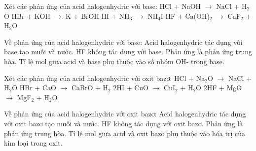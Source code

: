 \documentclass[Main.tex]{subfiles}
\begin{document}
    \begin{ex}
    Xét các phản ứng của acid halogenhydric với base:
    \choiceTF
    {\True HCl + NaOH $\rightarrow$ NaCl + H$_2$O}
    {HBr + KOH $\rightarrow$ K + BrOH}
    {\True HI + NH$_3$ $\rightarrow$ NH$_4$I}
    {\True HF + Ca(OH)$_2$ $\rightarrow$ CaF$_2$ + H$_2$O}
    \end{ex}
    
    \begin{ex}
    Về phản ứng của acid halogenhydric với base:
    \choiceTF
    {\True Acid halogenhydric tác dụng với base tạo muối và nước.}
    {HF không tác dụng với base.}
    {\True Phản ứng là phản ứng trung hòa.}
    {\True Tỉ lệ mol giữa acid và base phụ thuộc vào số nhóm OH- trong base.}
    \end{ex}
    
    \begin{ex}
    Xét các phản ứng của acid halogenhydric với oxit bazơ:
    \choiceTF
    {\True HCl + Na$_2$O $\rightarrow$ NaCl + H$_2$O}
    {HBr + CaO $\rightarrow$ CaBrO + H$_2$}
    {\True 2HI + CuO $\rightarrow$ CuI$_2$ + H$_2$O}
    {\True 2HF + MgO $\rightarrow$ MgF$_2$ + H$_2$O}
    \end{ex}
    
    \begin{ex}
    Về phản ứng của acid halogenhydric với oxit bazơ:
    \choiceTF
    {\True Acid halogenhydric tác dụng với oxit bazơ tạo muối và nước.}
    {HF không tác dụng với oxit bazơ.}
    {\True Phản ứng là phản ứng trung hòa.}
    {\True Tỉ lệ mol giữa acid và oxit bazơ phụ thuộc vào hóa trị của kim loại trong oxit.}
    \end{ex}
    
\end{document}

